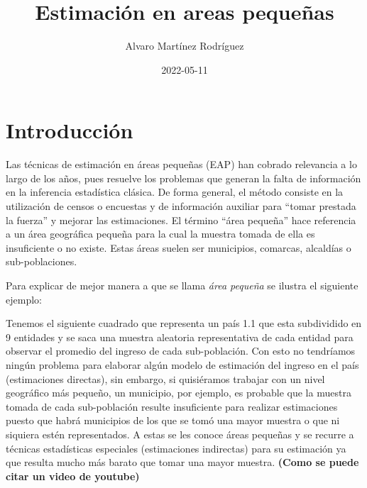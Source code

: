 \documentclass[
  11pt,
  spanish,
  oneside]{book}
\title{Estimación en areas pequeñas}
\author{Alvaro Martínez Rodríguez}
\date{2022-05-11}
\begin{document}
\maketitle

{
\setcounter{tocdepth}{1}
\tableofcontents
}
\hypertarget{introducciuxf3n}{%
\chapter*{Introducción}\label{introducciuxf3n}}

Las técnicas de estimación en áreas pequeñas (EAP) han cobrado relevancia a lo largo de los años, pues resuelve los problemas que generan la falta de información en la inferencia estadística clásica. De forma general, el método consiste en la utilización de censos o encuestas y de información auxiliar para ``tomar prestada la fuerza'' y mejorar las estimaciones. El término ``área pequeña'' hace referencia a un área geográfica pequeña para la cual la muestra tomada de ella es insuficiente o no existe. Estas áreas suelen ser municipios, comarcas, alcaldías o sub-poblaciones.

Para explicar de mejor manera a que se llama \emph{área pequeña} se ilustra el siguiente ejemplo:

Tenemos el siguiente cuadrado que representa un país 1.1 que esta subdividido en 9 entidades y se saca una muestra aleatoria representativa de cada entidad para observar el promedio del ingreso de cada sub-población. Con esto no tendríamos ningún problema para elaborar algún modelo de estimación del ingreso en el país (estimaciones directas), sin embargo, si quisiéramos trabajar con un nivel geográfico más pequeño, un municipio, por ejemplo, es probable que la muestra tomada de cada sub-población resulte insuficiente para realizar estimaciones puesto que habrá municipios de los que se tomó una mayor muestra o que ni siquiera estén representados. A estas se les conoce áreas pequeñas y se recurre a técnicas estadísticas especiales (estimaciones indirectas) para su estimación ya que resulta mucho más barato que tomar una mayor muestra. \textbf{(Como se puede citar un video de youtube)}
\end{document}
